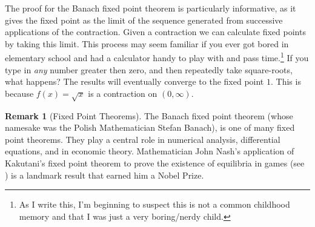 \documentclass{article}
\theoremstyle{definition}
\newtheorem{remark}{Remark}[section]
\begin{document}
	The proof for the Banach fixed point theorem is particularly informative, as it gives the fixed point as the limit of the sequence generated from successive applications of the contraction. Given a contraction we can calculate fixed points by taking this limit. This process may seem familiar if you ever got bored in elementary school and had a calculator handy to play with and pass time.\footnote{As I write this, I'm beginning to suspect this is not a common childhood memory and that I was just a very boring/nerdy child.} If you type in \textit{any} number greater then zero, and then repeatedly take square-roots, what happens? The results will eventually converge to the fixed point $ 1 $. This is because $ f(x)=\sqrt{x} $ is a contraction on $ (0,\infty) $. 	
	\begin{remark}[Fixed Point Theorems]
		The Banach fixed point theorem (whose namesake was the Polish Mathematician Stefan Banach), is one of many fixed point theorems. They play a central role in numerical analysis, differential equations, and in economic theory. Mathematician John Nash's application of Kakutani's fixed point theorem to prove the existence of equilibria in games (see \cite{nash1950equilibrium}) is a landmark result that earned him a Nobel Prize.
	\end{remark}
	
\end{document}
